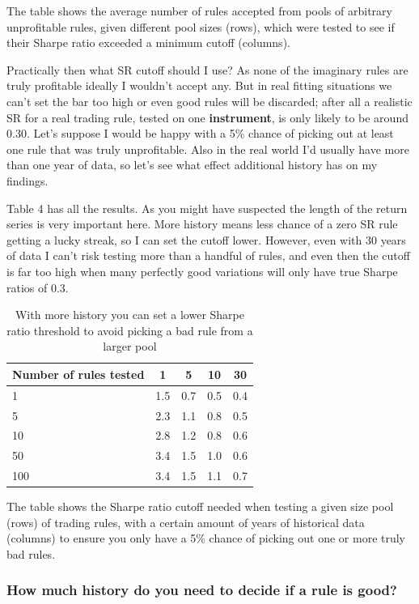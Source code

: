 The table shows the average number of rules accepted from pools of arbitrary unprofitable rules, given different pool sizes (rows), which were tested to see if their Sharpe ratio exceeded a minimum cutoff (columns).

Practically then what SR cutoff should I use? As none of the imaginary rules are truly profitable ideally I wouldn't accept any. But in real fitting situations we can't set the bar too high or even good rules will be discarded; after all a realistic SR for a real trading rule, tested on one \textbf{instrument}, is only likely to be around 0.30. Let's suppose I would be happy with a 5\% chance of picking out at least one rule that was truly unprofitable. Also in the real world I'd usually have more than one year of data, so let's see what effect additional history has on my findings.

Table 4 has all the results. As you might have suspected the length of the return series is very important here. More history means less chance of a zero SR rule getting a lucky streak, so I can set the cutoff lower. However, even with 30 years of data I can't risk testing more than a handful of rules, and even then the cutoff is far too high when many perfectly good variations will only have true Sharpe ratios of 0.3.

\begin{table}[htbp] \centering \small \caption{With more history you can set a lower Sharpe ratio threshold to avoid picking a bad rule from a larger pool} \begin{tabular}{@{} lcccc@{}}
\toprule
Number of rules tested & 1 & 5 & 10 & 30 \\
\midrule
1 & 1.5 & 0.7 & 0.5 & 0.4 \\
5 & 2.3 & 1.1 & 0.8 & 0.5 \\
10 & 2.8 & 1.2 & 0.8 & 0.6 \\
50 & 3.4 & 1.5 & 1.0 & 0.6 \\
100 & 3.4 & 1.5 & 1.1 & 0.7 \\
\bottomrule
\end{tabular}
\end{table}

The table shows the Sharpe ratio cutoff needed when testing a given size pool (rows) of trading rules, with a certain amount of years of historical data (columns) to ensure you only have a 5\% chance of picking out one or more truly bad rules.

\subsubsection*{How much history do you need to decide if a rule is good?}

